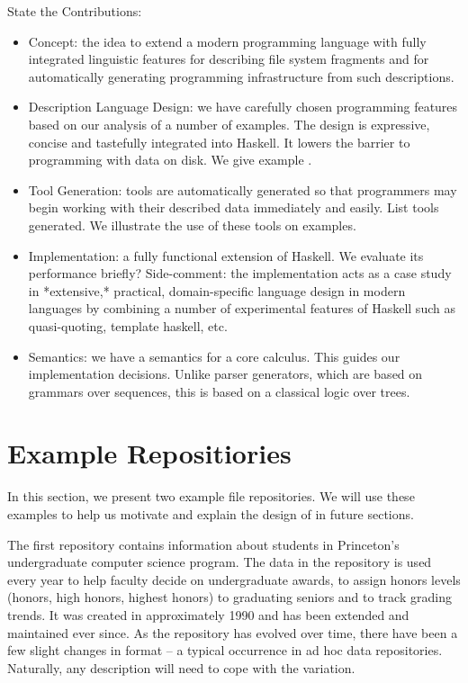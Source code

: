 \documentclass[natbib]{sigplanconf}
\begin{document}
State the Contributions:

\begin{itemize}
\item Concept:  the idea to extend a modern programming language with
fully integrated linguistic features for describing file system fragments
and for automatically generating programming infrastructure from such 
descriptions.

\item Description Language Design:  we have carefully chosen \forest{} programming
features based on our analysis of a number of examples.  The design
is expressive, concise and tastefully integrated into Haskell.
It lowers the barrier to programming with data on disk.  We give example
.

\item Tool Generation:  tools are automatically generated so that programmers
may begin working with their described data immediately and easily.  List
tools generated.  We illustrate the use of these tools on examples.

\item Implementation: a fully functional extension of Haskell.  
We evaluate its performance briefly?  Side-comment: the implementation
acts as a case study in *extensive,* practical,
domain-specific language design in modern languages by
combining a number of experimental features of Haskell such
as quasi-quoting, template haskell, etc.

\item Semantics: we have a semantics for a core calculus.  This
guides our implementation decisions.  Unlike parser generators,
which are based on grammars over sequences, this is based
on a classical logic over trees.
\end{itemize}

\section{Example Repositiories}
\label{sec:review}

In this section, we present two example file repositories.
We will use these examples to help us motivate and explain
the design of \forest{} in future sections.

The first repository contains information about students in
Princeton's undergraduate computer science program.   
The data in the repository is used
every year to help faculty decide on undergraduate awards,
to assign honors levels (honors, high honors, highest honors)
to graduating seniors and to track grading trends.
It was
created in approximately 1990 and has been extended and
maintained ever since.  As the repository has evolved over time, there
have been a few slight changes in format -- a typical occurrence in
ad hoc data repositories.  Naturally, any description will need to cope
with the variation.
 
\end{document}
